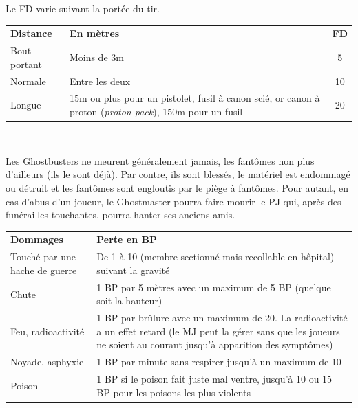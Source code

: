 \begin{frame}[b]
{\begin{minipage}[c][0.95\textheight][c]{\linewidth}

 Le FD varie suivant la portée du tir.

\begin{center}
\begin{tabular}{l p{5.5cm} c}
\textbf{Distance} & \textbf{En mètres} & \textbf{FD} \\
Bout-portant & Moins de 3m & 5 \\
Normale & Entre les deux & 10 \\ 
Longue & 15m ou plus pour un pistolet, fusil à canon scié, or canon à proton (\textit{proton-pack}), 150m pour un fusil &  20 \\
\end{tabular} \\
\end{center}


\myindent Les Ghostbusters ne meurent généralement jamais, les fantômes non plus d'ailleurs (ils le sont déjà). Par contre, ils sont blessés, le matériel est endommagé ou détruit et les fantômes sont engloutis par le piège à fantômes. Pour autant, en cas d'abus d'un joueur, le Ghostmaster pourra faire mourir le PJ qui, après des funérailles touchantes, pourra hanter ses anciens amis.

\begin{center}
\begin{tabular}{p{2cm} p{6cm}}
\textbf{Dommages} & \textbf{Perte en BP}\\
Touché par une hache de guerre & De 1 à 10 (membre sectionné mais recollable en hôpital) suivant la gravité \\
Chute & 1 BP par 5 mètres avec un maximum de 5 BP (quelque soit la hauteur) \\
Feu, radioactivité & 1 BP par brûlure avec un maximum de 20. La radioactivité a un effet retard (le MJ peut la gérer sans que les joueurs ne soient au courant jusqu'à apparition des symptômes) \\
Noyade, asphyxie & 1 BP par minute sans respirer jusqu'à un maximum de 10 \\
Poison & 1 BP si le poison fait juste mal ventre, jusqu'à 10 ou 15 BP pour les poisons les plus violents \\
\end{tabular}
\end{center}

\end{minipage}
}
\end{frame}

